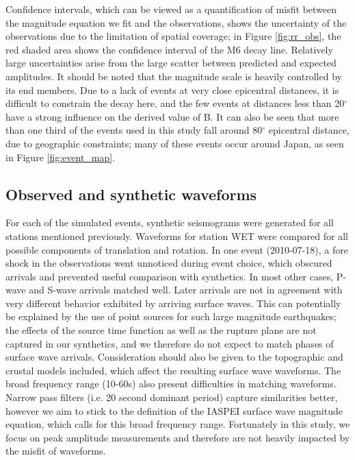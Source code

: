 \documentclass{gji}
\begin{document}
Confidence intervals, which can be viewed as a quantification of misfit between the magnitude equation we fit and the observations, shows the uncertainty of the observations due to the limitation of spatial coverage; in Figure \ref{fig:rr_obs}, the red shaded area shows the confidence interval of the M6 decay line. Relatively large uncertainties arise from the large scatter between predicted and expected amplitudes.%
It should be noted that the magnitude scale is heavily controlled by its end members. Due to a lack of events at very close epicentral distances, it is difficult to constrain the decay here, and the few events at distances less than 20$^\circ$ have a strong influence on the derived value of B. It can also be seen that more than one third of the events used in this study fall around 80$^\circ$ epicentral distance, due to geographic constraints; many of these events occur around Japan, as seen in Figure \ref{fig:event_map}.  

\subsection{Observed and synthetic waveforms}
For each of the simulated events, synthetic seismograms were generated for all stations mentioned previously. Waveforms for station WET were compared for all possible components of translation and rotation. In one event (2010-07-18), a fore shock in the observations went unnoticed during event choice, which obscured arrivals and prevented useful comparison with synthetics. In most other cases, P-wave and S-wave arrivals matched well. Later arrivals are not in agreement with very different behavior exhibited by arriving surface waves. This can potentially be explained by the use of point sources for such large magnitude earthquakes; the effects of the source time function as well as the rupture plane are not captured in our synthetics, and we therefore do not expect to match phases of surface wave arrivals. Consideration should also be given to the topographic and crustal models included, which affect the resulting surface wave waveforms. The broad frequency range (10-60s) also present difficulties in matching waveforms. Narrow pass filters (i.e. 20 second dominant period) capture similarities better, however we aim to stick to the definition of the IASPEI surface wave magnitude equation, which calls for this broad frequency range. Fortunately in this study, we focus on peak amplitude measurements and therefore are not heavily impacted by the misfit of waveforms.
\end{document}

